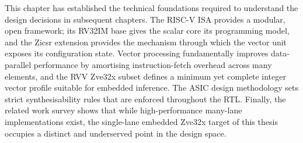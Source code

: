 This chapter has established the technical foundations required to understand the
design decisions in subsequent chapters. The RISC-V ISA provides a modular, open
framework; its RV32IM base gives the scalar core its programming model, and the
Zicsr extension provides the mechanism through which the vector unit exposes its
configuration state. Vector processing fundamentally improves data-parallel performance
by amortising instruction-fetch overhead across many elements, and the RVV Zve32x
subset defines a minimum yet complete integer vector profile suitable for embedded
inference. The ASIC design methodology sets strict synthesisability rules that are
enforced throughout the RTL. Finally, the related work survey shows that while
high-performance many-lane implementations exist, the single-lane embedded Zve32x
target of this thesis occupies a distinct and underserved point in the design space.
